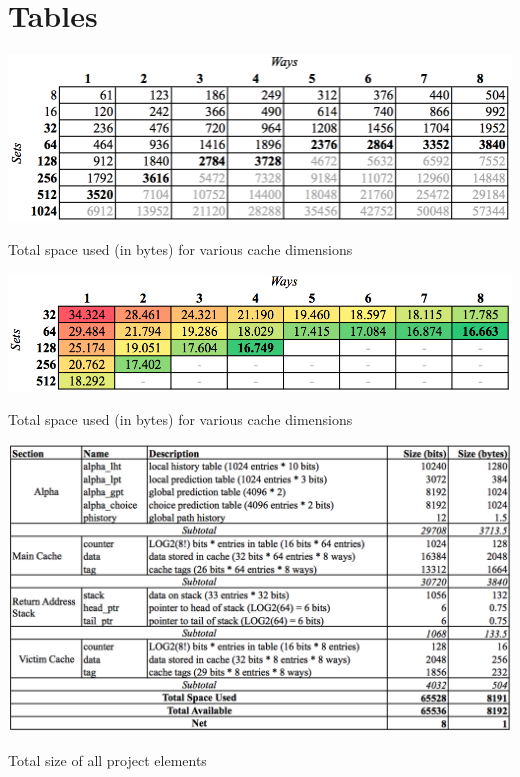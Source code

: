 \documentclass[twocolumn]{article}
\newcommand{\centertable}[3]{
\begin{table}[ht!]  
\begin{center} #1
\caption{#2}
\label{#3}
\end{center}
\end{table}}
\begin{document}
\section{Tables}
\vspace{-.15in}\centertable{\includegraphics[width=5.25in]{img/sizebydim.png}}{Total space used (in bytes) for various cache dimensions}{sizebydim}
\vspace{-.35in}\centertable{\includegraphics[width=5.25in]{img/mispersize.png}}{Total space used (in bytes) for various cache dimensions}{mispersize}
\centertable{\includegraphics[width=\columnwidth]{img/sizebudget.png}}{Total size of all project elements}{sizebudget}
\end{document}
